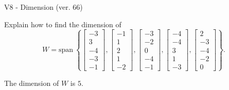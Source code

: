 \begin{exercise}
  \begin{exerciseTitle}V8 - Dimension (ver. 66)\end{exerciseTitle}
  \begin{exerciseStatement}
    Explain how to find the dimension of 
\[W=\mathrm{span}\ \left\{\left[\begin{array}{r}
-3 \\
3 \\
-4 \\
-3 \\
-1
\end{array}\right] , \left[\begin{array}{r}
-1 \\
1 \\
2 \\
1 \\
-2
\end{array}\right] , \left[\begin{array}{r}
-3 \\
-2 \\
0 \\
-4 \\
-1
\end{array}\right] , \left[\begin{array}{r}
-4 \\
-4 \\
3 \\
1 \\
-3
\end{array}\right] , \left[\begin{array}{r}
2 \\
-3 \\
-4 \\
-2 \\
0
\end{array}\right]\right\}.\]



  \end{exerciseStatement}
  \begin{exerciseAnswer}
   The dimension of \(W\) is  \(5\).
  


  \end{exerciseAnswer}
\end{exercise}